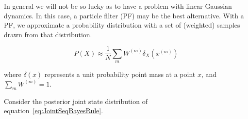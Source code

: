 In general we will not be so lucky as to have a problem with linear-Gaussian dynamics. In this case, a particle filter (PF) may be the best alternative. With a PF, we approximate a probability distribution with a set of (weighted) samples drawn from that distribution.

\begin{equation}
P(X) \approx \frac{1}{N} \sum_m{W^{(m)} \delta_{X} (x^{(m)})}
\label{eq:ParticleApprox}
\end{equation}

where $\delta (x)$ represents a unit probability point mass at a point $x$, and $\sum_m{W^{(m)}}=1$.

Consider the posterior joint state distribution of equation~\ref{eq:JointSeqBayesRule}. 

